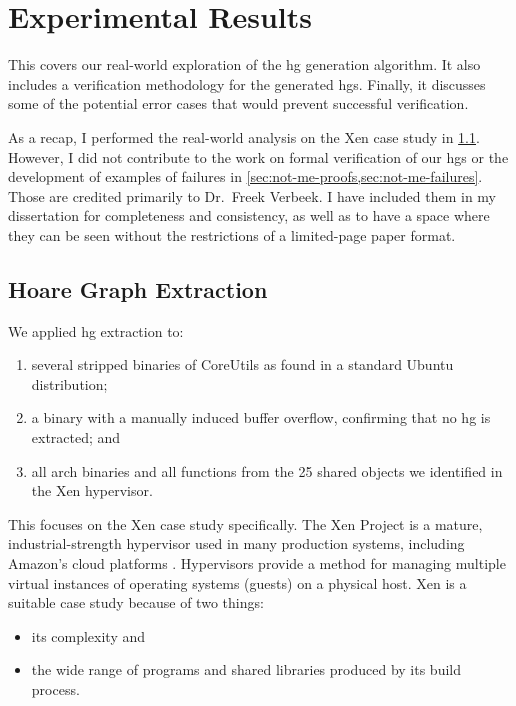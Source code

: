 \chapter{Experimental Results}\label{ch:hg-results}
This  covers our real-world exploration of the \ac{hg} generation algorithm.
It also includes a verification methodology for the generated \acp{hg}.
Finally, it discusses some of the potential error cases that would prevent successful verification.

As a recap, I performed the real-world analysis on the Xen case study in \cref{hg-extraction}.
However, I did not contribute to the work on formal verification of our \acp{hg} or the development of examples of failures in \cref{sec:not-me-proofs,sec:not-me-failures}.
Those  are credited primarily to Dr.~Freek Verbeek.
I have included them in my dissertation for completeness and consistency, as well as to have a space where they can be seen without the restrictions of a limited-page paper format.

\section{Hoare Graph Extraction}\label{hg-extraction}
We applied \ac{hg} extraction to:
\begin{enumerate}
  \item several stripped binaries of CoreUtils as found in a standard Ubuntu distribution;
  \item a binary with a manually induced buffer overflow, confirming that no \ac{hg} is extracted; and
  \item all  \gls{arch} binaries and all  functions from the 25 shared objects we identified in the Xen hypervisor.
\end{enumerate}
This  focuses on the Xen case study specifically.
The Xen Project is a mature, industrial-strength hypervisor used in many production systems, including Amazon's cloud platforms \autocite{chisnall2008definitive}.
Hypervisors provide a method for managing multiple virtual instances of operating systems (guests) on a physical host.
Xen is a suitable case study because of two things:
\begin{itemize}
  \item its complexity and
  \item the wide range of programs and shared libraries produced by its build process.
\end{itemize}

